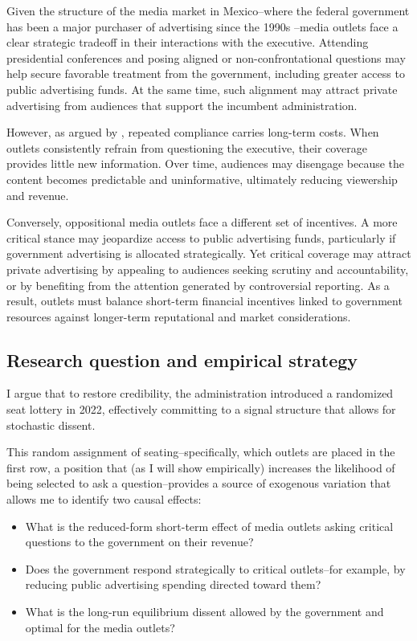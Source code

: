 \documentclass[11pt]{article}
\begin{document}
Given the structure of the media market in Mexico--where the federal government has been a major purchaser of advertising since the 1990s \citep{Times, FourthState-Lawson-Book}--media outlets face a clear strategic tradeoff in their interactions with the executive. Attending presidential conferences and posing aligned or non-confrontational questions may help secure favorable treatment from the government, including greater access to public advertising funds. At the same time, such alignment may attract private advertising from audiences that support the incumbent administration.

However, as argued by \cite{GehlbachSonin2014}, repeated compliance carries long-term costs. When outlets consistently refrain from questioning the executive, their coverage provides little new information. Over time, audiences may disengage because the content becomes predictable and uninformative, ultimately reducing viewership and revenue.

Conversely, oppositional media outlets face a different set of incentives. A more critical stance may jeopardize access to public advertising funds, particularly if government advertising is allocated strategically. Yet critical coverage may attract private advertising by appealing to audiences seeking scrutiny and accountability, or by benefiting from the attention generated by controversial reporting. As a result, outlets must balance short-term financial incentives linked to government resources against longer-term reputational and market considerations.

\subsection{Research question and empirical strategy}

I argue that to restore credibility, the administration introduced a randomized seat lottery in 2022, effectively committing to a signal structure that allows for stochastic dissent.

This random assignment of seating--specifically, which outlets are placed in the first row, a position that (as I will show empirically) increases the likelihood of being selected to ask a question--provides a source of exogenous variation that allows me to identify two causal effects:

\begin{itemize}
\item What is the reduced-form short-term effect of media outlets asking critical questions to the government on their revenue?
\item Does the government respond strategically to critical outlets--for example, by reducing public advertising spending directed toward them?
\item What is the long-run equilibrium dissent allowed by the government and optimal for the media outlets?
\end{itemize}
\end{document}

